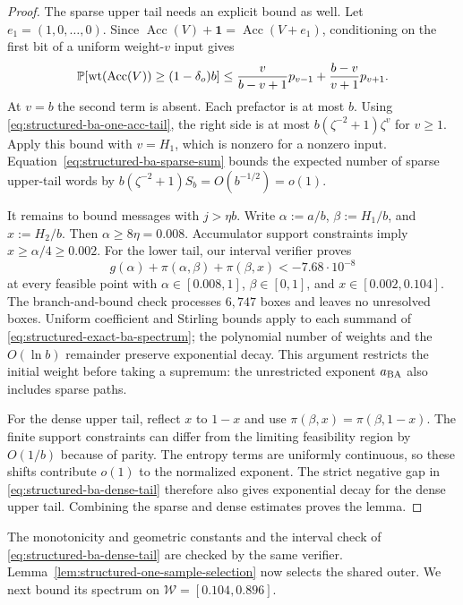 \begin{proof}
The sparse upper tail needs an explicit bound as well. Let
$e_1=(1,0,\ldots,0)$. Since
$\operatorname{Acc}(V)+\mathbf1=\operatorname{Acc}(V+e_1)$,
conditioning on the first bit of a uniform weight-$v$ input gives
\[
 \mathbb P[\operatorname{wt}(\operatorname{Acc}(V))\ge(1-\delta_o)b]
 \le \frac{v}{b-v+1}p_{v-1}
      +\frac{b-v}{v+1}p_{v+1}.
\]
At $v=b$ the second term is absent. Each prefactor is at most $b$.
Using \eqref{eq:structured-ba-one-acc-tail}, the right side is at most
$b(\zeta^{-2}+1)\zeta^v$ for $v\ge1$.
Apply this bound with $v=H_1$, which is nonzero for a nonzero input.
Equation~\eqref{eq:structured-ba-sparse-sum} bounds the expected number
of sparse upper-tail words by $b(\zeta^{-2}+1)S_b=O(b^{-1/2})=o(1)$.

It remains to bound messages with $j>\eta b$. Write
$\alpha:=a/b$, $\beta:=H_1/b$, and $x:=H_2/b$.
Then $\alpha\ge8\eta=0.008$. Accumulator support constraints imply
$x\ge\alpha/4\ge0.002$. For the lower tail, our interval verifier\repositorycite{} proves
\begin{equation}
  g(\alpha)+\pi(\alpha,\beta)+\pi(\beta,x)
  <-7.68\cdot10^{-8}
  \label{eq:structured-ba-dense-tail}
\end{equation}
at every feasible point with
$\alpha\in[0.008,1]$, $\beta\in[0,1]$, and $x\in[0.002,0.104]$.
The branch-and-bound check processes $6{,}747$ boxes and leaves no
unresolved boxes. Uniform coefficient and Stirling bounds apply to
each summand of \eqref{eq:structured-exact-ba-spectrum}; the polynomial
number of weights and the $O(\ln b)$ remainder preserve exponential decay.
This argument restricts the initial weight before taking a supremum:
the unrestricted exponent $a_{\rm BA}$ also includes sparse paths.

For the dense upper tail, reflect $x$ to $1-x$ and use
$\pi(\beta,x)=\pi(\beta,1-x)$.
The finite support constraints can differ from the limiting feasibility
region by $O(1/b)$ because of parity. The entropy terms are uniformly
continuous, so these shifts contribute $o(1)$ to the normalized exponent.
The strict negative gap in \eqref{eq:structured-ba-dense-tail} therefore
also gives exponential decay for the dense upper tail.
Combining the sparse and dense estimates proves the lemma.
\end{proof}

The monotonicity and geometric constants and the interval check of
\eqref{eq:structured-ba-dense-tail} are checked by the same verifier.
Lemma~\ref{lem:structured-one-sample-selection} now selects the shared
outer. We next bound its spectrum on $\mathcal W=[0.104,0.896]$.

